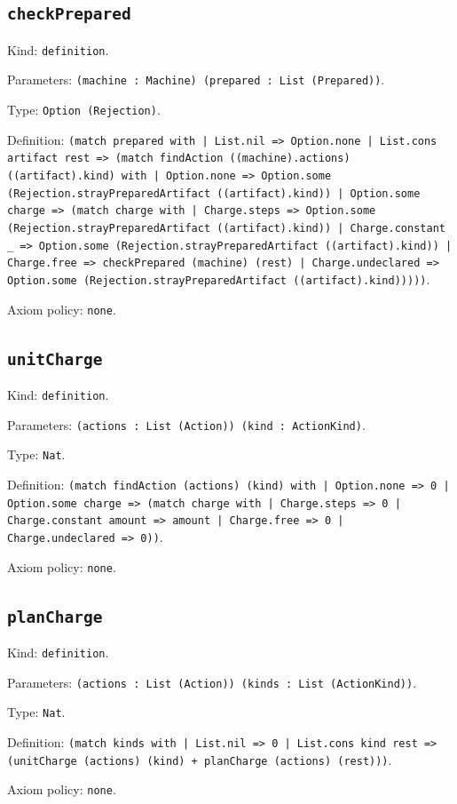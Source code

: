 \documentclass[11pt]{article}
\begin{document}
\subsection*{\texttt{checkPrepared}}
\noindent Kind: \texttt{definition}.\par
\noindent Parameters: \texttt{(machine : Machine) (prepared : List (Prepared))}.\par
\noindent Type: \texttt{Option (Rejection)}.\par
\noindent Definition: \texttt{(match prepared with | List.nil => Option.none | List.cons artifact rest => (match findAction ((machine).actions) ((artifact).kind) with | Option.none => Option.some (Rejection.strayPreparedArtifact ((artifact).kind)) | Option.some charge => (match charge with | Charge.steps => Option.some (Rejection.strayPreparedArtifact ((artifact).kind)) | Charge.constant \_ => Option.some (Rejection.strayPreparedArtifact ((artifact).kind)) | Charge.free => checkPrepared (machine) (rest) | Charge.undeclared => Option.some (Rejection.strayPreparedArtifact ((artifact).kind)))))}.\par
\noindent Axiom policy: \texttt{none}.\par
\subsection*{\texttt{unitCharge}}
\noindent Kind: \texttt{definition}.\par
\noindent Parameters: \texttt{(actions : List (Action)) (kind : ActionKind)}.\par
\noindent Type: \texttt{Nat}.\par
\noindent Definition: \texttt{(match findAction (actions) (kind) with | Option.none => 0 | Option.some charge => (match charge with | Charge.steps => 0 | Charge.constant amount => amount | Charge.free => 0 | Charge.undeclared => 0))}.\par
\noindent Axiom policy: \texttt{none}.\par
\subsection*{\texttt{planCharge}}
\noindent Kind: \texttt{definition}.\par
\noindent Parameters: \texttt{(actions : List (Action)) (kinds : List (ActionKind))}.\par
\noindent Type: \texttt{Nat}.\par
\noindent Definition: \texttt{(match kinds with | List.nil => 0 | List.cons kind rest => (unitCharge (actions) (kind) + planCharge (actions) (rest)))}.\par
\noindent Axiom policy: \texttt{none}.\par
\end{document}
